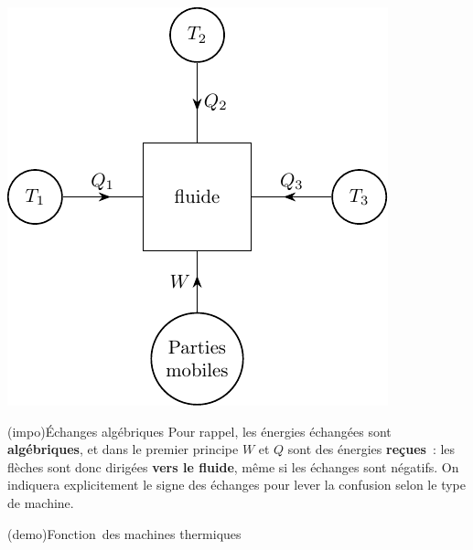 \documentclass[../../main/main.tex]{subfiles}
\begin{document}
\begin{tcb*}[sidebyside, label=prop:mchn]
\begin{center}
{			\includegraphics[scale=.8]{ppe_gen}
		}
	\end{center}
\end{tcb*}

\begin{tcb*}(impo){Échanges algébriques}
	Pour rappel, les énergies échangées sont \textbf{algébriques}, et dans le
	premier principe $W$ et $Q$ sont des énergies \textbf{reçues}~: les flèches
	sont donc dirigées \textbf{vers le fluide}, même si les échanges sont
	négatifs. On indiquera explicitement le signe des échanges pour lever la
	confusion selon le type de machine.
\end{tcb*}

\begin{tcb*}[sidebyside, sidebyside align=top](demo){Fonction\mnt\ des machines thermiques}
	\vspace{-15pt}
	\vspace{-15pt}
	\tcblower
	\vspace{-15pt}
	\vspace{-15pt}
\end{tcb*}
\end{document}
